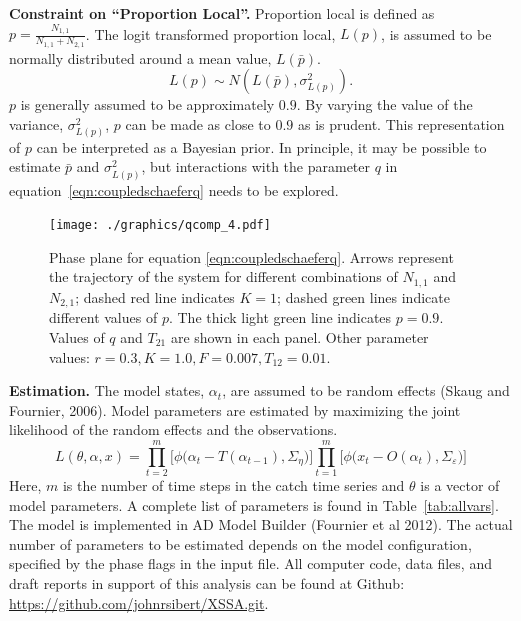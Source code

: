 \documentclass[12pt,letterpaper]{article}
\newcommand\None{{N_{1,1}}}
\newcommand\Ntwo{{N_{2,1}}}
\newcommand\Nsum{{N_{1,1}+N_{2,1}}}
\begin{document}
{\bf Constraint on ``Proportion Local''.}
Proportion local is defined as $p = \frac{\None}{\Nsum}$. The logit
transformed proportion local, $L(p)$, is assumed to be normally
distributed around a mean value, $L(\bar{p})$.
\begin{equation}
\label{eqn:LpropL}
L(p)\sim N(L(\bar{p}),\sigma^2_{L(p)}).
\end{equation} 
$p$ is generally assumed to be approximately $0.9$. By varying the
value of the variance, $\sigma^2_{L(p)}$, $p$ can be made as
close to $0.9$ as is prudent.
This representation of $p$ can be interpreted as a Bayesian prior.
In principle, it may be possible to
estimate $\bar{p}$ and $\sigma^2_{L(p)}$, but interactions with
the parameter $q$ in equation~\ref{eqn:coupledschaeferq} needs to be
explored.

\begin{figure}
\begin{center}
\texttt{[image: ./graphics/qcomp\_4.pdf]}
\caption{\label{fig:NNphase}
Phase plane for equation \ref{eqn:coupledschaeferq}. Arrows represent
the trajectory of the system for different combinations of $\None$ and
$\Ntwo$; dashed red  line indicates $K = 1$; dashed green lines indicate
different values of $p$. The thick light green line indicates $p=0.9$.
Values of $q$ and $T_{21}$ are shown in each panel.
Other parameter values: $r=0.3, K=1.0, F = 0.007, T_{12}=0.01$.
}
\end{center}
\end{figure}


{\bf Estimation.} The model states, $\alpha_t$, are assumed to be random
effects (Skaug and Fournier, 2006). Model parameters are estimated by
maximizing the joint likelihood of the random
effects and the observations.
\begin{equation}
L(\theta,\alpha,x)=
\prod^m_{t=2}\big[\phi\big(\alpha_t-T(\alpha_{t-1}), \Sigma_\eta\big)\big]
\prod^m_{t=1}\big[\phi\big(x_t-O(\alpha_t), \Sigma_\varepsilon\big)\big]
\end{equation}
Here, $m$ is the number of time steps in the catch time series and
$\theta$ is a vector of model parameters. A complete list of
parameters is found in Table~\ref{tab:allvars}. 
The model is implemented in AD Model Builder (Fournier et al 2012).
The actual number of
parameters to be estimated depends on the model configuration,
specified by the phase flags in the input file. 
All computer code, data files, and draft reports in support of this
analysis can be found at Github:\linebreak
\url{https://github.com/johnrsibert/XSSA.git}.
\end{document}
